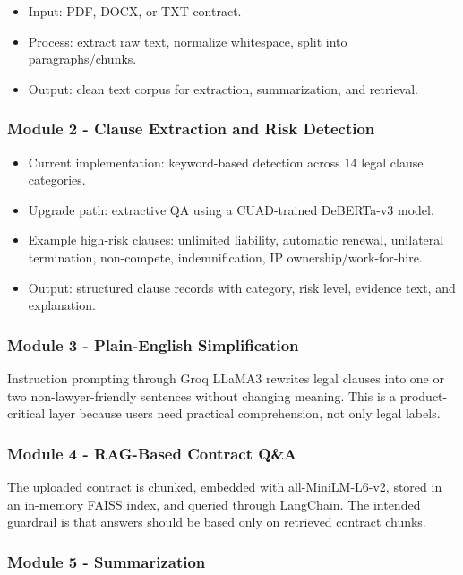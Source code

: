 \documentclass[11pt,a4paper]{article}
\begin{document}
\begin{itemize}
\item Input: PDF, DOCX, or TXT contract.
\item Process: extract raw text, normalize whitespace, split into paragraphs/chunks.
\item Output: clean text corpus for extraction, summarization, and retrieval.
\end{itemize}

\subsubsection{Module 2 - Clause Extraction and Risk Detection}

\begin{itemize}
\item Current implementation: keyword-based detection across 14 legal clause categories.
\item Upgrade path: extractive QA using a CUAD-trained DeBERTa-v3 model.
\item Example high-risk clauses: unlimited liability, automatic renewal, unilateral termination, non-compete, indemnification, IP ownership/work-for-hire.
\item Output: structured clause records with category, risk level, evidence text, and explanation.
\end{itemize}

\subsubsection{Module 3 - Plain-English Simplification}

Instruction prompting through Groq LLaMA3 rewrites legal clauses into one or two non-lawyer-friendly sentences without changing meaning. This is a product-critical layer because users need practical comprehension, not only legal labels.

\subsubsection{Module 4 - RAG-Based Contract Q\&A}

The uploaded contract is chunked, embedded with all-MiniLM-L6-v2, stored in an in-memory FAISS index, and queried through LangChain. The intended guardrail is that answers should be based only on retrieved contract chunks.

\subsubsection{Module 5 - Summarization}
\end{document}

